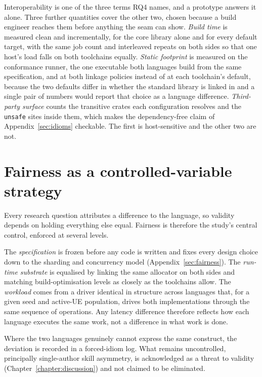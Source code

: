 \documentclass[english,oneside,a4paper,censored,csm,software-track-2020]{HYthesisML}
\begin{document}
\begin{appendices}
Interoperability is one of the three terms RQ4 names, and a prototype answers it alone. Three
further quantities cover the other two, chosen because a build engineer reaches them before
anything the seam can show. \emph{Build time} is measured clean and incrementally, for the core
library alone and for every default target, with the same job count and interleaved repeats on both
sides so that one host's load falls on both toolchains equally. \emph{Static footprint} is measured
on the conformance runner, the one executable both languages build from the same specification, and
at both linkage policies instead of at each toolchain's default, because the two defaults differ in
whether the standard library is linked in and a single pair of numbers would report that choice as
a language difference. \emph{Third-party surface} counts the transitive crates each configuration
resolves and the \texttt{unsafe} sites inside them, which makes the dependency-free claim of
Appendix~\ref{sec:idioms} checkable. The first is host-sensitive and the other two are not.


\section{Fairness as a controlled-variable strategy}\label{sec:controls}
Every research question attributes a difference to the language, so validity depends on holding
everything else equal. Fairness is therefore the study's central control, enforced at several
levels.

The \emph{specification} is frozen before any code is written and fixes every design choice down
to the sharding and concurrency model (Appendix~\ref{sec:fairness}). The \emph{run-time substrate}
is equalised by linking the
same allocator on both sides and matching build-optimisation levels as closely as the toolchains
allow. The \emph{workload} comes from a driver identical in structure across languages that, for
a given seed and active-UE population, drives both implementations through the same sequence of
operations. Any latency difference therefore reflects how each language executes the same work,
not a difference in what work is done.

Where the two languages genuinely cannot express the same construct, the deviation is recorded
in a forced-idiom log. What remains uncontrolled, principally single-author skill asymmetry, is
acknowledged as a threat to validity (Chapter~\ref{chapter:discussion}) and not claimed to be
eliminated.


\end{appendices}
\end{document}
